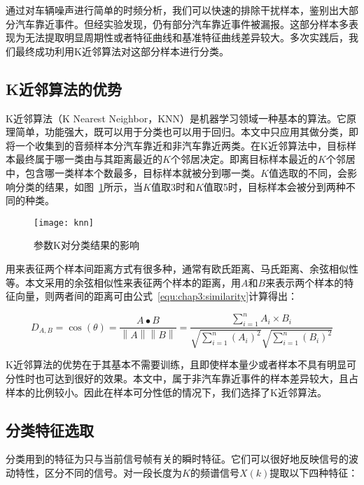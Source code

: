 通过对车辆噪声进行简单的时频分析，我们可以快速的排除干扰样本，鉴别出大部分汽车靠近事件。但经实验发现，仍有部分汽车靠近事件被漏报。这部分样本多表现为无法提取明显周期性或者特征曲线和基准特征曲线差异较大。多次实践后，我们最终成功利用K近邻算法对这部分样本进行分类。

\subsection{K近邻算法的优势}

K近邻算法（K Nearest Neighbor，KNN）是机器学习领域一种基本的算法。它原理简单，功能强大，既可以用于分类也可以用于回归。本文中只应用其做分类，即将一个收集到的音频样本分汽车靠近和非汽车靠近两类。在K近邻算法中，目标样本最终属于哪一类由与其距离最近的$K$个邻居决定。即离目标样本最近的$K$个邻居中，包含哪一类样本个数最多，目标样本就被分到哪一类。$K$值选取的不同，会影响分类的结果，如图~\ref{fig:knn}所示，当$K$值取3时和$K$值取5时，目标样本会被分到两种不同的种类。


\begin{figure}[htbp] %
  \centering
  \texttt{[image: knn]}
  \caption{参数K对分类结果的影响}
  \label{fig:knn}
\end{figure}


用来表征两个样本间距离方式有很多种，通常有欧氏距离、马氏距离、余弦相似性等。本文采用的余弦相似性来表征两个样本的距离，用$A$和$B$来表示两个样本的特征向量，则两者间的距离可由公式~\ref{equ:chap3:similarity}计算得出：

\begin{equation}
\label{equ:chap3:similarity}
{D_{A,B}} = \cos \left( \theta  \right) = \frac{{A \bullet B}}{{\left\| A \right\|\left\| B \right\|}} = \frac{{\sum\limits_{i = 1}^n {{A_i} \times {B_i}} }}{{\sqrt {\sum\limits_{i = 1}^n {{{\left( {{A_i}} \right)}^2}} } \sqrt {\sum\limits_{i = 1}^n {{{\left( {{B_i}} \right)}^2}} } }}
\end{equation}


K近邻算法的优势在于其基本不需要训练，且即使样本量少或者样本不具有明显可分性时也可达到很好的效果。本文中，属于非汽车靠近事件的样本差异较大，且占样本的比例较小。因此在样本可分性低的情况下，我们选择了K近邻算法。

\subsection{分类特征选取}
分类用到的特征为只与当前信号帧有关的瞬时特征。它们可以很好地反映信号的波动特性，区分不同的信号。对一段长度为$K$的频谱信号$X(k)$提取以下四种特征：

